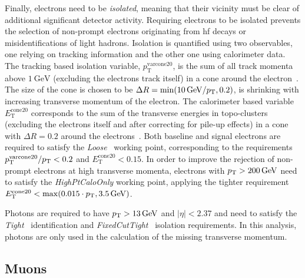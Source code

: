 Finally, electrons need to be \textit{isolated}, meaning that their vicinity must be clear of additional significant detector activity.
Requiring electrons to be isolated prevents the selection of non-prompt electrons originating from \eg \gls{hf} decays or misidentifications of light hadrons.
Isolation is quantified using two observables, one relying on tracking information and the other one using calorimeter data. The tracking based isolation variable, $p_{\mathrm{T}}^{\mathrm{varcone20}}$, is the sum of all track momenta above $\SI{1}{\GeV}$ (excluding the electrons track itself) in a cone around the electron~\cite{EGAM-2018-01}.
The size of the cone is chosen to be $\Delta R = \min (\SI{10}{\GeV}/\pt,0.2)$, \ie is shrinking with increasing transverse momentum of the electron.
The calorimeter based variable $E_{\mathrm{T}}^{\mathrm{cone20}}$ corresponds to the sum of the transverse energies in topo-clusters (excluding the electrons itself and after correcting for pile-up effects) in a cone with $\Delta R = 0.2$ around the electrons~\cite{EGAM-2018-01}.
Both baseline and signal electrons are required to satisfy the \textit{Loose}~\cite{EGAM-2018-01} working point, corresponding to the requirements $p_{\mathrm{T}}^{\mathrm{varcone20}}/p_{\textrm{T}} < 0.2$ and $E_{\mathrm{T}}^{\mathrm{cone20}} < 0.15$.
In order to improve the rejection of non-prompt electrons at high transverse momenta, electrons with $\pt >\SI{200}{\GeV}$ need to satisfy the \textit{HighPtCaloOnly} working point, applying the tighter requirement $E_{\mathrm{T}}^{\mathrm{cone20}} < \max (0.015\cdot\pt,\SI{3.5}{\GeV})$. 

Photons are required to have $p_{\textrm{T}} > \SI{13}{GeV}$ and $\vert\eta\vert<2.37$ and need to satisfy the \textit{Tight}~\cite{EGAM-2018-01} identification and \textit{FixedCutTight}~\cite{EGAM-2018-01} isolation requirements.
In this analysis, photons are only used in the calculation of the missing transverse momentum.

\subsection{Muons}

